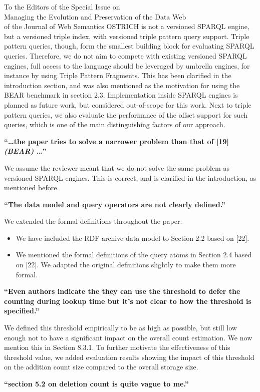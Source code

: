 \documentclass{letter}
\newcounter{section}
\begin{document}
\begin{letter}{To the Editors of the Special Issue on\\Managing the Evolution and Preservation of the Data Web\\of the Journal of Web Semantics}
OSTRICH is not a versioned SPARQL engine, but a versioned triple index,
with versioned triple pattern query support.
Triple pattern queries, though, form the smallest building block for evaluating SPARQL queries.
Therefore, we do not aim to compete with existing versioned SPARQL engines,
full access to the language should be leveraged by umbrella engines,
for instance by using Triple Pattern Fragments.
This has been clarified in the introduction section, and was also mentioned as the motivation for using the BEAR benchmark in section 2.3.
Implementation inside SPARQL engines is planned as future work, but considered out-of-scope for this work.
Next to triple pattern queries,
we also evaluate the performance of the offset support for such queries,
which is one of the main distinguishing factors of our approach.

\textbf{\enquote{\ldots the paper tries to solve a narrower problem than that of [19] \emph{(BEAR)} \ldots}}

We assume the reviewer meant that we do not solve the same problem as versioned SPARQL engines.
This is correct, and is clarified in the introduction, as mentioned before.

\textbf{\enquote{The data model and query operators are not clearly defined.}}

We extended the formal definitions throughout the paper:
\begin{itemize}
    \item We have included the RDF archive data model to Section 2.2 based on [22].
    \item We mentioned the formal definitions of the query atoms in Section 2.4 based on [22]. We adapted the original definitions slightly to make them more formal.
\end{itemize}

\textbf{\enquote{Even authors indicate the they can use the threshold to defer the counting during lookup time but it's not clear to how the threshold is specified.}}

We defined this threshold empirically to be as high as possible, but still low enough not to have a significant impact on the overall count estimation.
We now mention this in Section 8.3.1.
To further motivate the effectiveness of this threshold value,
we added evaluation results showing the impact of this threshold on the addition count size compared to the overall storage size.

\textbf{\enquote{section 5.2 on deletion count is quite vague to me.}}


\end{letter}
\end{document}
